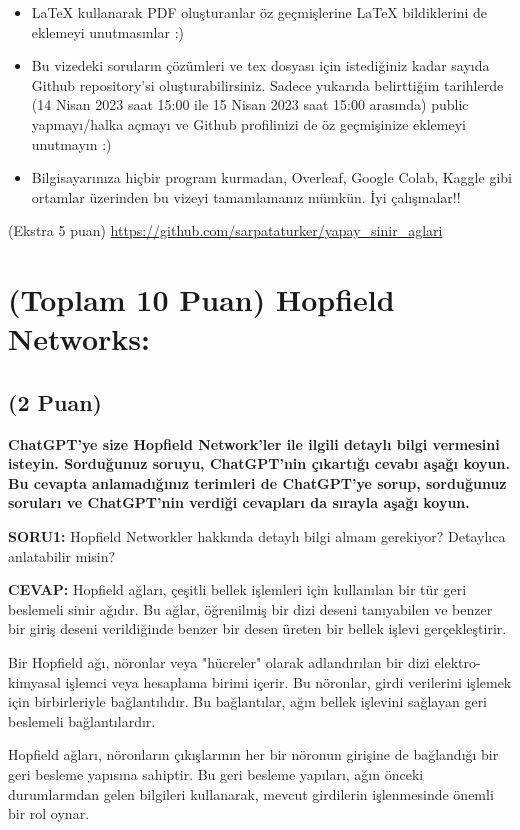 \documentclass[11pt]{article}
\begin{document}
\begin{itemize}
    \item LaTeX kullanarak PDF oluşturanlar öz geçmişlerine LaTeX bildiklerini de eklemeyi unutmasınlar :)
    \item Bu vizedeki soruların çözümleri ve tex dosyası için istediğiniz kadar sayıda Github repository'si oluşturabilirsiniz. Sadece yukarıda belirttiğim tarihlerde (14 Nisan 2023 saat 15:00 ile 15 Nisan 2023 saat 15:00 arasında) public yapmayı/halka açmayı ve Github profilinizi de öz geçmişinize eklemeyi unutmayın :)
    \item Bilgisayarınıza hiçbir program kurmadan, Overleaf, Google Colab, Kaggle gibi ortamlar üzerinden bu vizeyi tamamlamanız mümkün. İyi çalışmalar!!
\end{itemize}

(Ekstra 5 puan) \url{https://github.com/sarpataturker/yapay_sinir_aglari}

\newpage
\section{(Toplam 10 Puan) Hopfield Networks:}

\subsection{(2 Puan)} \textbf{ChatGPT’ye size Hopfield Network’ler ile ilgili detaylı bilgi vermesini isteyin. Sorduğunuz soruyu, ChatGPT'nin çıkartığı cevabı aşağı koyun. Bu cevapta anlamadığınız terimleri de ChatGPT’ye sorup, sorduğunuz soruları ve ChatGPT’nin verdiği cevapları da sırayla aşağı koyun.}

\textbf{SORU1:} Hopfield Networkler hakkında detaylı bilgi almam gerekiyor? Detaylıca anlatabilir misin?

\textbf{CEVAP:} Hopfield ağları, çeşitli bellek işlemleri için kullanılan bir tür geri beslemeli sinir ağıdır. Bu ağlar, öğrenilmiş bir dizi deseni tanıyabilen ve benzer bir giriş deseni verildiğinde benzer bir desen üreten bir bellek işlevi gerçekleştirir.

Bir Hopfield ağı, nöronlar veya "hücreler" olarak adlandırılan bir dizi elektro-kimyasal işlemci veya hesaplama birimi içerir. Bu nöronlar, girdi verilerini işlemek için birbirleriyle bağlantılıdır. Bu bağlantılar, ağın bellek işlevini sağlayan geri beslemeli bağlantılardır.

Hopfield ağları, nöronların çıkışlarının her bir nöronun girişine de bağlandığı bir geri besleme yapısına sahiptir. Bu geri besleme yapıları, ağın önceki durumlarından gelen bilgileri kullanarak, mevcut girdilerin işlenmesinde önemli bir rol oynar.
\end{document}

